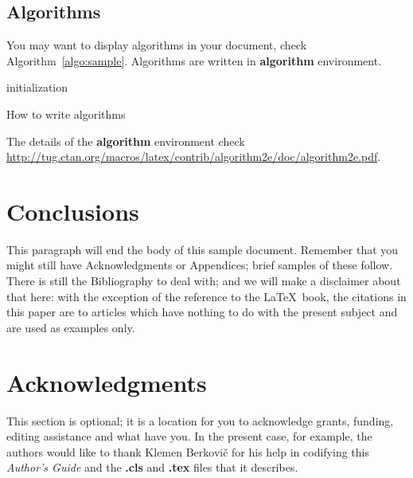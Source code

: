 \documentclass[article]{stucosrec}
\begin{document}
	\subsection{Algorithms}
	
	You may want to display algorithms in your document, check Algorithm~\ref{algo:sample}.
	Algorithms are written in \textbf{algorithm} environment.
	
	\begin{algorithm}
		\SetAlgoLined
		initialization\;
		\caption{How to write algorithms}
		\label{algo:sample}
	\end{algorithm}

	The details of the \textbf{algorithm} environment check \url{http://tug.ctan.org/macros/latex/contrib/algorithm2e/doc/algorithm2e.pdf}.
	
	\section{Conclusions}
	
	This paragraph will end the body of this sample document.
	Remember that you might still have Acknowledgments or Appendices; brief samples of these follow.
	There is still the Bibliography to deal with; and we will make a disclaimer about that here: with the exception of the reference to the \LaTeX\ book, the citations in this paper are to articles which have nothing to do with the present subject and are used as examples only.
	
	\section{Acknowledgments}
	
	This section is optional; it is a location for you to acknowledge grants, funding, editing assistance and what have you.
	In the present case, for example, the authors would like to thank Klemen Berkovič for his help in codifying this \textit{Author's Guide} and the \textbf{.cls} and \textbf{.tex} files that it describes.

	
	
\end{document}
